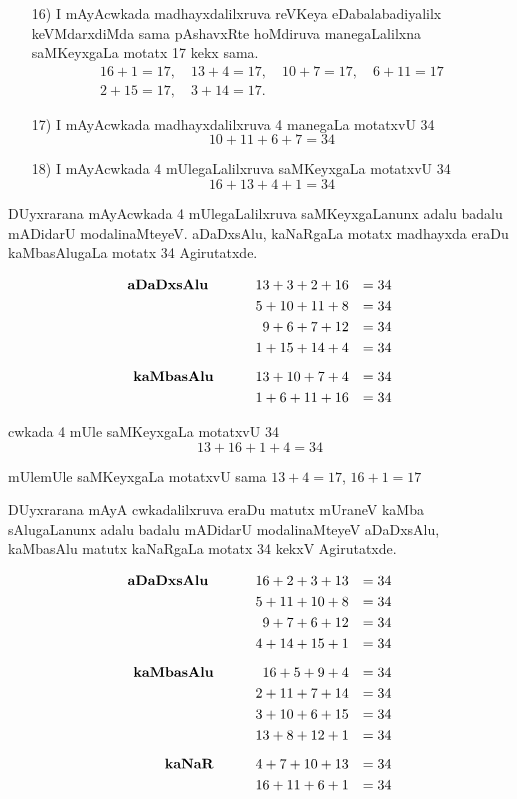 \begin{enumerate}
\item[{\rm 16)}] I mAyAcwkada madhayxdalilxruva reVKeya eDabalabadiyalilx keVMdarxdiMda sama pAshavxRte hoMdiruva manegaLalilxna saMKeyxgaLa motatx {\rm 17} kekx sama.
\begin{gather*}
16+1=17, \quad 13+4=17, \quad 10+7=17, \quad 6+11=17 \\
2+15=17, \quad 3+14=17.
\end{gather*}
 
\item[{\rm 17)}] I mAyAcwkada madhayxdalilxruva {\rm 4} manegaLa motatxvU {\rm 34}
$$
10+11+6+7=34
$$

\item[{\rm 18)}] I mAyAcwkada {\rm 4} mUlegaLalilxruva saMKeyxgaLa motatxvU {\rm 34}
$$
16+13+4+1=34
$$
\end{enumerate}

DUyxrarana mAyAcwkada {\rm 4} mUlegaLalilxruva saMKeyxgaLanunx adalu badalu mADidarU modalinaMteyeV. aDaDxsAlu, kaNaRgaLa motatx madhayxda eraDu kaMbasAlugaLa motatx {\rm 34} Agirutatxde.

\begin{center}
\end{center}

\begin{alignat*}{3}
\text{\bf aDaDxsAlu }\qquad  && 13+3+2+16&&=34\\
&&5+10+11+8&&=34\\
&&9+6+7+12&&=34\\
&&1+15+14+4&&=34\\[0.2cm]
\text{\bf kaMbasAlu} \qquad  &&13+10+7+4 &&=34\\
&&1+6+11+16&&=34
\end{alignat*}

cwkada {\rm 4} mUle saMKeyxgaLa motatxvU {\rm 34}
$$
13+16+1+4=34
$$

mUlemUle saMKeyxgaLa motatxvU sama $13+4=17$, \quad $16+1=17$

DUyxrarana mAyA cwkadalilxruva eraDu matutx mUraneV kaMba sAlugaLanunx adalu badalu mADidarU modalinaMteyeV aDaDxsAlu, kaMbasAlu matutx kaNaRgaLa motatx {\rm 34} kekxV Agirutatxde.

\begin{center}
\end{center}

\begin{alignat*}{3}
\text{\bf aDaDxsAlu }\qquad  && 16+2+3+13&&=34\\
&&5+11+10+8&&=34\\
&&9+7+6+12&&=34\\
&&4+14+15+1&&=34\\[0.2cm]
\text{\bf kaMbasAlu} \qquad  &&16+5+9+4 &&=34\\
&&2+11+7+14&&=34\\
&&3+10+6+15&&=34\\
&&13+8+12+1&&=34\\[0.2cm]
\text{\bf kaNaR} \qquad  &&4+7+10+13 &&=34\\
&&16+11+6+1&&=34\\
\end{alignat*}
